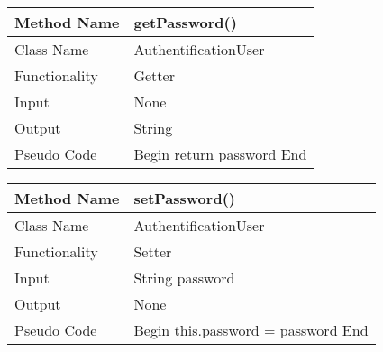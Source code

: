 \documentclass{article}
\newcommand\tab[1][1cm]{\hspace*{#1}}
\begin{document}
\begin{center}
\begin{tabular}{|p{2.5cm}||p{10cm}|}
\hline
Method Name & getPassword() \\
\hline
Class Name & AuthentificationUser \\
\hline
Functionality & Getter\\
\hline
Input & None\\
\hline
Output & String\\
\hline
Pseudo Code & Begin\newline
\tab return password\newline
End \\
\hline
\end{tabular}
\end{center}

\begin{center}
\begin{tabular}{|p{2.5cm}||p{10cm}|}
\hline
Method Name & setPassword() \\
\hline
Class Name & AuthentificationUser \\
\hline
Functionality & Setter\\
\hline
Input & String password\\
\hline
Output & None\\
\hline
Pseudo Code & Begin\newline
\tab this.password = password\newline
End \\
\hline
\end{tabular}
\end{center}

\end{document}
